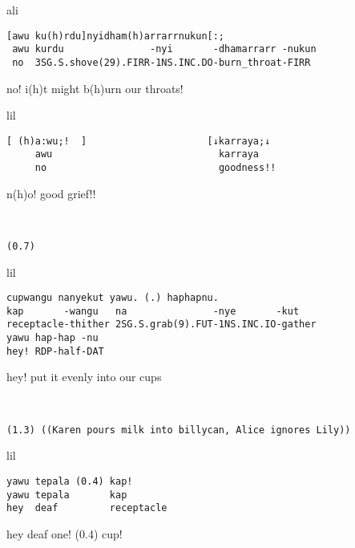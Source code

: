 \documentclass[output=paper,nonflat,colorlinks,citecolor=brown]{langsci/langscibook}
\begin{document}
\vspace{2mm}
%
\begin{transbox}{1}{ali}
\begin{verbatim}
[awu ku(h)rdu]nyidham(h)arrarrnukun[:;
 awu kurdu               -nyi       -dhamarrarr -nukun
 no  3SG.S.shove(29).FIRR-1NS.INC.DO-burn_throat-FIRR
\end{verbatim}
\hspace{0.07cm} no! i(h)t might b(h)urn our throats!
\end{transbox}
%
\begin{transbox}{2}{lil}
\begin{verbatim}
[ (h)a:wu;!  ]                     [↓karraya;↓
     awu                             karraya
     no                              goodness!!
\end{verbatim}
\hspace{0.65cm} n(h)o! \hspace{3.85cm} good grief!!
\end{transbox}
%
\begin{transbox}{3}{~}
\begin{verbatim}
(0.7)
\end{verbatim}
\end{transbox}\vspace{-1mm}
%
\begin{mdframednoverticalspace}[style=firstfoc]
\begin{transbox}{4}{lil} %
\begin{verbatim}
cupwangu nanyekut yawu. (.) haphapnu.
kap       -wangu   na               -nye       -kut
receptacle-thither 2SG.S.grab(9).FUT-1NS.INC.IO-gather
yawu hap-hap -nu
hey! RDP-half-DAT
\end{verbatim}
hey! put it evenly into our cups
\end{transbox}
\end{mdframednoverticalspace}
%
\begin{transbox}{5}{~}
\begin{verbatim}
(1.3) ((Karen pours milk into billycan, Alice ignores Lily))
\end{verbatim}
\end{transbox}
%
\begin{mdframednoverticalspace}[style=firstfoc]
\begin{transbox}{6}{lil} %
\begin{verbatim}
yawu tepala (0.4) kap!
yawu tepala       kap
hey  deaf         receptacle
\end{verbatim}
hey deaf one! (0.4) cup!
\end{transbox}
\end{mdframednoverticalspace}\vspace{1mm}
\end{document}
